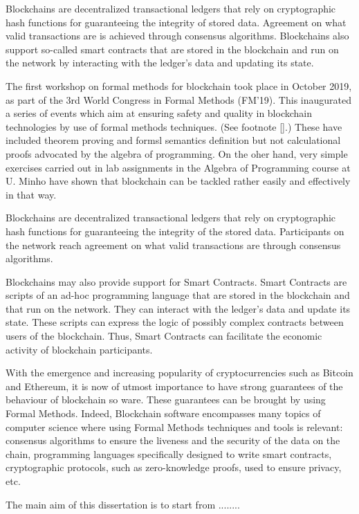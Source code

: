 \documentclass[a4paper, 11pt]{article} %
\begin{document}
Blockchains are decentralized transactional ledgers that rely on cryptographic hash functions for guaranteeing the integrity of stored data. Agreement on what valid transactions are is achieved through consensus algorithms. Blockchains also support so-called smart contracts that are stored in the blockchain and run on the network by interacting with the ledger’s data and updating its state. 

The first workshop on formal methods for blockchain took place in October 2019, as part of the 3rd World Congress in Formal Methods (FM'19). This inaugurated a series of events which aim at ensuring safety and quality in blockchain technologies by use of formal methods techniques. (See footnote \ref{}.) These have included theorem proving and formsl semantics definition but not calculational proofs advocated by the algebra of programming. On the oher hand, very simple exercises carried out in lab assignments in the Algebra of Programming course at U. Minho have shown that blockchain can be tackled rather easily and effectively in that way.

Blockchains are decentralized transactional ledgers that rely on cryptographic hash functions for guaranteeing the integrity of the stored data. Participants on the network reach agreement on what valid transactions are through consensus algorithms.

Blockchains may also provide support for Smart Contracts. Smart Contracts are scripts of an ad-hoc programming language that are stored in the blockchain and that run on the network. They can interact with the ledger’s data and update its state. These scripts can express the logic of possibly complex contracts between users of the blockchain. Thus, Smart Contracts can facilitate the economic activity of blockchain participants.

With the emergence and increasing popularity of cryptocurrencies such as Bitcoin and Ethereum, it is now of utmost importance to have strong guarantees of the behaviour of blockchain so ware. These guarantees can be brought by using Formal Methods. Indeed, Blockchain software encompasses many topics of computer science where using Formal Methods techniques and tools is relevant: consensus algorithms to ensure the liveness and the security of the data on the chain, programming languages specifically designed to write smart contracts, cryptographic protocols, such as zero-knowledge proofs, used to ensure privacy, etc.

The main aim of this dissertation is to start from ........
\end{document}
